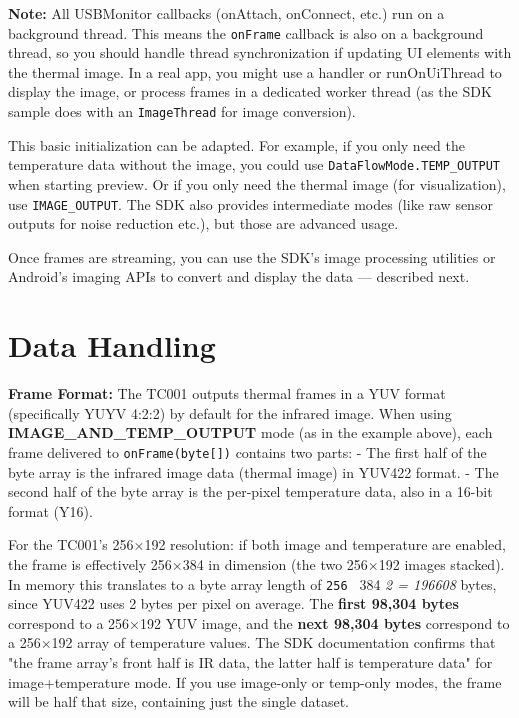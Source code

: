 {\begin{itemize}
\end{itemize}
\textbf{Note:} All USBMonitor callbacks (onAttach, onConnect, etc.) run on a
background
thread\cite{ElectrodermalActivityWiki}.
This means the \texttt{onFrame} callback is also on a background thread, so you
should handle thread synchronization if updating UI elements with the
thermal image. In a real app, you might use a handler or runOnUiThread
to display the image, or process frames in a dedicated worker thread (as
the SDK sample does with an \texttt{ImageThread} for image conversion).

This basic initialization can be adapted. For example, if you only need
the temperature data without the image, you could use
\texttt{DataFlowMode.TEMP_OUTPUT} when starting preview. Or if you only need
the thermal image (for visualization), use \texttt{IMAGE_OUTPUT}. The SDK also
provides intermediate modes (like raw sensor outputs for noise reduction
etc.), but those are advanced usage.

Once frames are streaming, you can use the SDK's image processing
utilities or Android's imaging APIs to convert and display the data ---
described next.

\section{Data Handling}

\textbf{Frame Format:} The TC001 outputs thermal frames in a YUV format
(specifically YUYV 4:2:2) by default for the infrared
image\cite{ContactlessStressThermal2022}.
When using \textbf{IMAGE_AND_TEMP_OUTPUT} mode (as in the example above),
each frame delivered to \texttt{onFrame(byte[])} contains two parts: - The
first half of the byte array is the infrared image data (thermal image)
in YUV422 format. - The second half of the byte array is the per-pixel
temperature data, also in a 16-bit format (Y16).

For the TC001's 256×192 resolution: if both image and temperature are
enabled, the frame is effectively 256×384 in dimension (the two 256×192
images stacked). In memory this translates to a byte array length of
\texttt{256 } 384 \textit{ 2 = 196608} bytes, since YUV422 uses 2 bytes per pixel on
average. The \textbf{first 98,304 bytes} correspond to a 256×192 YUV image,
and the \textbf{next 98,304 bytes} correspond to a 256×192 array of
temperature
values\cite{ContactlessStressThermal2022}\cite{DriverStressThermal2020}.
The SDK documentation confirms that "the frame array's front half is IR
data, the latter half is temperature data" for image+temperature
mode\cite{DriverStressThermal2020}\cite{DriverStressThermal2020}.
If you use image-only or temp-only modes, the frame will be half that
size, containing just the single dataset.

}
